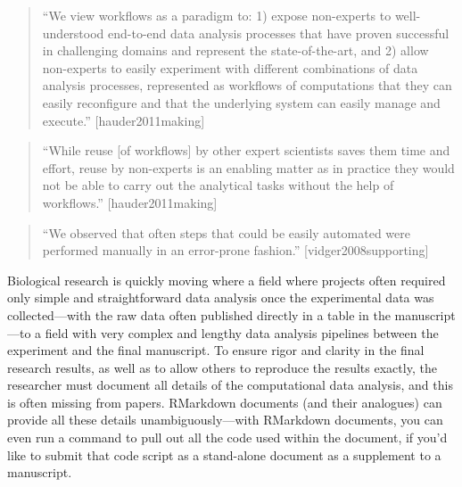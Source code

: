 \documentclass[]{tufte-book}
\begin{document}
\begin{quote}
``We view workflows as a paradigm to: 1) expose non-experts to well-understood
end-to-end data analysis processes that have proven successful in challenging
domains and represent the state-of-the-art, and 2) allow non-experts to easily
experiment with different combinations of data analysis processes, represented
as workflows of computations that they can easily reconfigure and that the
underlying system can easily manage and execute.'' {[}hauder2011making{]}
\end{quote}

\begin{quote}
``While reuse {[}of workflows{]} by other expert scientists saves them time and
effort, reuse by non-experts is an enabling matter as in practice they would
not be able to carry out the analytical tasks without the help of
workflows.'' {[}hauder2011making{]}
\end{quote}

\begin{quote}
``We observed that often steps that could be easily automated were performed manually
in an error-prone fashion.'' {[}vidger2008supporting{]}
\end{quote}

Biological research is quickly moving where a field where projects often required
only simple and straightforward data analysis once the experimental data was
collected---with the raw data often published directly in a table in the manuscript---to
a field with very complex and lengthy data analysis pipelines between the experiment
and the final manuscript. To ensure rigor and clarity in the final research results,
as well as to allow others to reproduce the results exactly, the researcher must
document all details of the computational data analysis, and this is often
missing from papers. RMarkdown documents (and their analogues) can provide all these
details unambiguously---with RMarkdown documents, you can even run a command to
pull out all the code used within the document, if you'd like to submit that
code script as a stand-alone document as a supplement to a manuscript.
\end{document}
